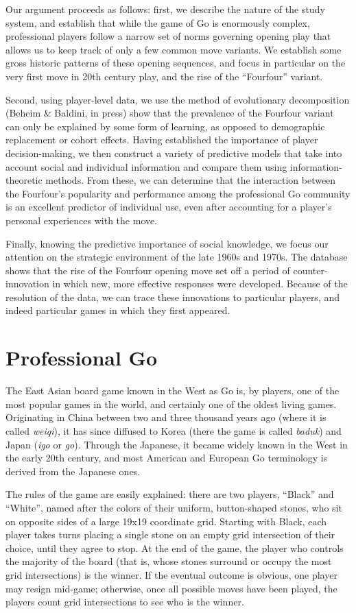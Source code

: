 Our argument proceeds as follows: first, we describe the nature of the study system, and establish that while the game of Go is enormously complex, professional players follow a narrow set of norms governing opening play that allows us to keep track of only a few common move variants.  We establish some gross historic patterns of these opening sequences, and focus in particular on the very first move in 20th century play, and the rise of the ``Fourfour'' variant.  

Second, using player-level data, we use the method of evolutionary decomposition (Beheim \& Baldini, in press) show that the prevalence of the Fourfour variant can only be explained by some form of learning, as opposed to demographic replacement or cohort effects.  Having established the importance of player decision-making, we then construct a variety of predictive models that take into account social and individual information and compare them using information-theoretic methods.  From these, we can determine that the interaction between the Fourfour's popularity and performance among the professional Go community is an excellent predictor of individual use, even after accounting for a player's personal experiences with the move.

Finally, knowing the predictive importance of social knowledge, we focus our attention on the strategic environment of the late 1960s and 1970s.  The database shows that the rise of the Fourfour opening move set off a period of counter-innovation in which new, more effective responses were developed.  Because of the resolution of the data, we can trace these innovations to particular players, and indeed particular games in which they first appeared.  


\section{Professional Go}

The East Asian board game known in the West as Go is, by players, one of the most popular games in the world, and certainly one of the oldest living games.  Originating in China between two and three thousand years ago (where it is called \textit{weiqi}), it has since diffused to Korea (there the game is called \textit{baduk}) and Japan (\textit{igo} or \textit{go}).  Through the Japanese, it became widely known in the West in the early 20th century, and most American and European Go terminology is derived from the Japanese ones.

The rules of the game are easily explained: there are two players, ``Black'' and ``White'', named after the colors of their uniform, button-shaped stones, who sit on opposite sides of a large 19x19 coordinate grid.  Starting with Black, each player takes turns placing a single stone on an empty grid intersection of their choice, until they agree to stop.  At the end of the game, the player who controls the majority of the board (that is, whose stones surround or occupy the most grid intersections) is the winner.  If the eventual outcome is obvious, one player may resign mid-game; otherwise, once all possible moves have been played, the players count grid intersections to see who is the winner.
 

